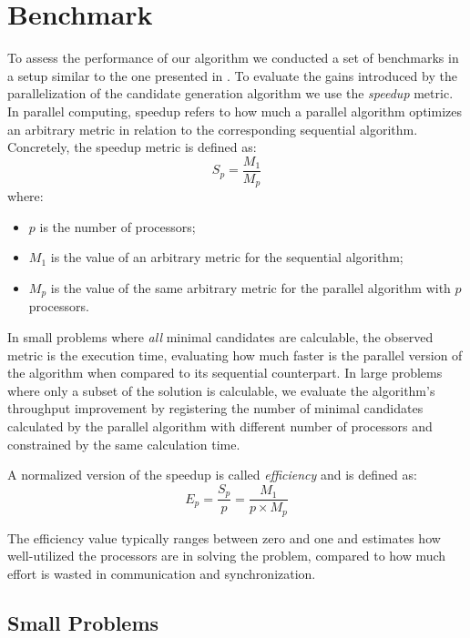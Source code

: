 \section{Benchmark}
\label{sec:mhs2p:results}
To assess the performance of our algorithm we conducted a set of
benchmarks in a setup similar to the one presented in
.
%
To evaluate the gains introduced by the parallelization of the
candidate generation algorithm we use the \emph{speedup} metric.
%
In parallel computing, speedup refers to how much a parallel algorithm
optimizes an arbitrary metric in relation to the corresponding
sequential algorithm.
%
Concretely, the speedup metric is defined as:
\begin{equation}
  S_p = \frac{M_1}{M_p}
\end{equation}
where:
\begin{itemize}
\item $p$ is the number of processors;
\item $M_1$ is the value of an arbitrary metric for the sequential
  algorithm;
\item $M_p$ is the value of the same arbitrary metric for the parallel
  algorithm with $p$ processors.
\end{itemize}

In small problems where \emph{all} minimal candidates are calculable,
the observed metric is the execution time, evaluating how much faster
is the parallel version of the algorithm when compared to its
sequential counterpart.
%
In large problems where only a subset of the solution is calculable,
we evaluate the algorithm's throughput improvement by registering the
number of minimal candidates calculated by the parallel algorithm with
different number of processors and constrained by the same calculation
time.

A normalized version of the speedup is called \emph{efficiency} and is
defined as:
\begin{equation}
  E_p = \frac{S_p}{p} = \frac{M_1}{p \times M_p}
\end{equation}

The efficiency value typically ranges between zero and one and
estimates how well-utilized the processors are in solving the problem,
compared to how much effort is wasted in communication and
synchronization.


\subsection{Small Problems}
\label{sec:mhs2p:results:small}

